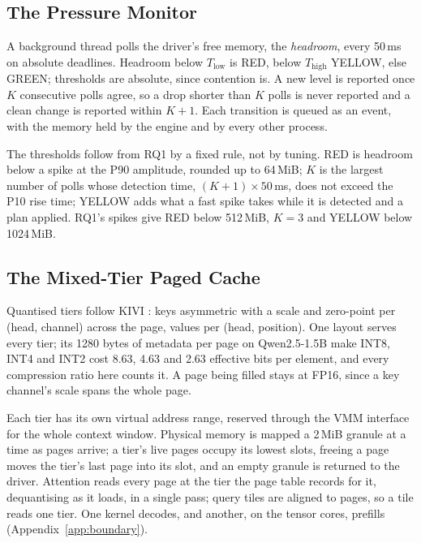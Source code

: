 \documentclass{article}
\begin{document}
\subsection{The Pressure Monitor}
\label{sec:monitor}

A background thread polls the driver's free memory, the \textit{headroom},
every 50\,ms on absolute deadlines. Headroom below $T_\mathrm{low}$ is RED,
below $T_\mathrm{high}$ YELLOW, else GREEN; thresholds are absolute, since
contention is. A new level is reported once $K$ consecutive polls agree, so a
drop shorter than $K$ polls is never reported and a clean change is reported
within $K+1$. Each transition is queued as an event, with the memory held by
the engine and by every other process.

The thresholds follow from RQ1 by a fixed rule, not by tuning. RED is headroom
below a spike at the P90 amplitude, rounded up to 64\,MiB; $K$ is the largest
number of polls whose detection time, $(K+1) \times 50$\,ms, does not exceed the
P10 rise time; YELLOW adds what a fast spike takes while it is detected and a
plan applied. RQ1's spikes give RED below 512\,MiB, $K = 3$ and YELLOW below
1024\,MiB.

\subsection{The Mixed-Tier Paged Cache}
\label{sec:cache}

Quantised tiers follow KIVI \citep{liu2024kivi}: keys asymmetric with a scale
and zero-point per (head, channel) across the page, values per (head,
position). One layout serves every tier; its 1280 bytes of metadata per page
on Qwen2.5-1.5B make INT8, INT4 and INT2 cost 8.63, 4.63 and 2.63 effective
bits per element, and every compression ratio here counts it. A page being
filled stays at FP16, since a key channel's scale spans the whole page.

Each tier has its own virtual address range, reserved through the VMM interface
for the whole context window. Physical memory is mapped a 2\,MiB granule at a
time as pages arrive; a tier's live pages occupy its lowest slots, freeing a
page moves the tier's last page into its slot, and an empty granule is returned
to the driver. Attention reads every page at the tier the page table records
for it, dequantising as it loads, in a single pass; query tiles are aligned to
pages, so a tile reads one tier. One kernel decodes, and another, on the tensor
cores, prefills (Appendix~\ref{app:boundary}).
\end{document}
